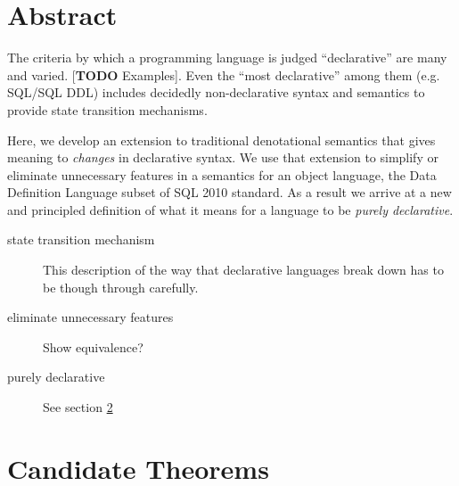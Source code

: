 \documentclass[12pt]{article}
\begin{document}
\section{Abstract}

The criteria by which a programming language is judged ``declarative'' are many and varied. [\textbf{TODO} Examples]. Even the ``most declarative'' among them (e.g. SQL/SQL DDL) includes decidedly non-declarative syntax and semantics to provide state transition mechanisms.

Here, we develop an extension to traditional denotational semantics that gives meaning to \emph{changes} in declarative syntax. We use that extension to simplify or eliminate unnecessary features in a semantics for an object language, the Data Definition Language subset of SQL 2010 standard. As a result we arrive at a new and principled definition of what it means for a language to be \emph{purely declarative}.

\begin{description}
  \item[state transition mechanism] This description of the way that declarative languages break down has to be though through carefully.
  \item[eliminate unnecessary features] Show equivalence?
  \item[purely declarative] See section \ref{sec:theorems}
\end{description}

\section{Candidate Theorems}
\label{sec:theorems}
\end{document}
